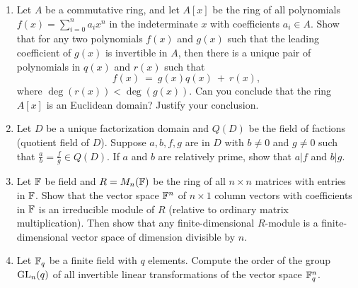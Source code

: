 \begin{enumerate}
\vspace{0.2in}

\item Let $A$ be a commutative ring, and let $ A[x]$ be the ring of all
polynomials $f(x)=\sum_{i=0}^na_i x^n$ in the indeterminate $x$ with 
coefficients $a_i \in A$.
Show that for any two polynomials $f(x) $ and $ g(x)$
such that the leading coefficient of $g(x)$ is invertible in $A$, then
there is a unique pair of polynomials in $q(x)$ and $ r(x) $ such that 
\[f(x)\ =\ g(x)q(x)\ +\ r(x),\]
where $\deg(r(x))<\deg(g(x))$. Can you conclude that the ring $A[x]$ is an
Euclidean domain? Justify your conclusion.

\vspace{0.2in}

\item Let $D$ be a unique factorization domain and $ Q(D) $ be the field of
factions (quotient field of $D$). Suppose  $ a, b, f, g $ are in $ D$ 
with $ b\neq 0 $ and $ g\neq 0 $ such that $ \frac{a}{b}=\frac{f}{g}\in Q(D)$. If $
a $ and $ b$ are relatively prime, show that $ a|f$ and $b|g$. 

\vspace{0.2in}

 
\item Let ${\Bbb F}$ be field and $R=M_n({\Bbb F}) $ be the ring of all $n\times
n$ matrices with entries in ${\Bbb F}$. Show that the vector space $ {\Bbb F}^n $ of
$n\times 1$ column vectors with coefficients in ${\Bbb F}$
is an irreducible module of $R$ (relative to ordinary matrix multiplication). 
Then show that any
finite-dimensional $R$-module  is a finite-dimensional vector space of
dimension divisible by $n$. 

\vspace{0.2in}

\item Let ${\Bbb F}_q$ be a finite field with $q$ elements. Compute the order of
the group ${\rm GL}_n(q)$ of all invertible linear transformations of the vector space 
${\Bbb F}_q^n$. 
    

\end{enumerate}

